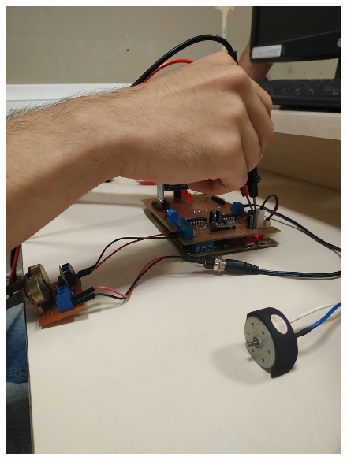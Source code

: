 \begin{figure}[H]
\centering
\includegraphics[width=1\linewidth]{imagenes/testing2.jpg}
\label{fig:testing2}
\end{figure}

